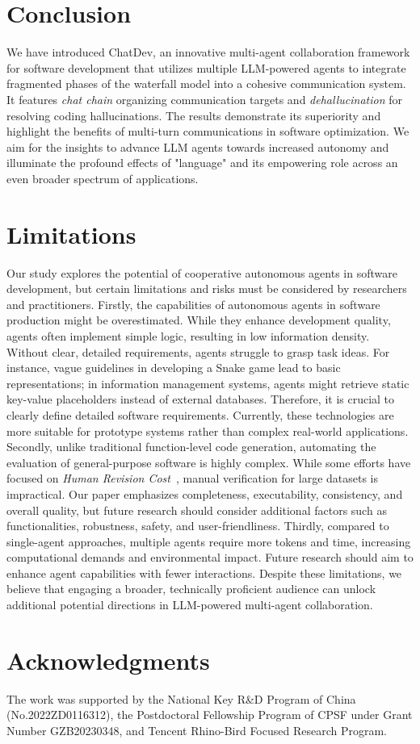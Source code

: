 \documentclass[11pt]{article}
\begin{document}
\section{Conclusion}
We have introduced ChatDev, an innovative multi-agent collaboration framework for software development that utilizes multiple LLM-powered agents to integrate fragmented phases of the waterfall model into a cohesive communication system. It features \textit{chat chain} organizing communication targets and \textit{dehallucination} for resolving coding hallucinations. 
The results demonstrate its superiority and highlight the benefits of multi-turn communications in software optimization.
We aim for the insights to advance LLM agents towards increased autonomy and illuminate the profound effects of "language" and its empowering role across an even broader spectrum of applications.


\section{Limitations}
Our study explores the potential of cooperative autonomous agents in software development, but certain limitations and risks must be considered by researchers and practitioners.
Firstly, the capabilities of autonomous agents in software production might be overestimated. While they enhance development quality, agents often implement simple logic, resulting in low information density. Without clear, detailed requirements, agents struggle to grasp task ideas. For instance, vague guidelines in developing a Snake game lead to basic representations; in information management systems, agents might retrieve static key-value placeholders instead of external databases. Therefore, it is crucial to clearly define detailed software requirements. Currently, these technologies are more suitable for prototype systems rather than complex real-world applications.
Secondly, unlike traditional function-level code generation, automating the evaluation of general-purpose software is highly complex. While some efforts have focused on \textit{Human Revision Cost}~\cite{hong2023metagpt}, manual verification for large datasets is impractical. Our paper emphasizes completeness, executability, consistency, and overall quality, but future research should consider additional factors such as functionalities, robustness, safety, and user-friendliness.
Thirdly, compared to single-agent approaches, multiple agents require more tokens and time, increasing computational demands and environmental impact. Future research should aim to enhance agent capabilities with fewer interactions.
Despite these limitations, we believe that engaging a broader, technically proficient audience can unlock additional potential directions in LLM-powered multi-agent collaboration.


\section*{Acknowledgments}
The work was supported by the National Key R\&D Program of China (No.2022ZD0116312), the Postdoctoral Fellowship Program of CPSF under Grant Number GZB20230348, and Tencent Rhino-Bird Focused Research Program.



\end{document}
